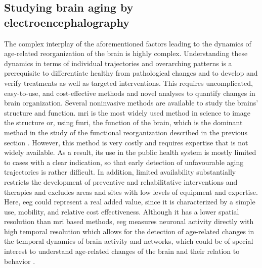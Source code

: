 \subsection{Studying brain aging by electroencephalography}
The complex interplay of the aforementioned factors leading to the dynamics of age-related reorganization of the brain is highly complex. Understanding these dynamics in terms of individual trajectories and overarching patterns is a prerequisite to differentiate healthy from pathological changes and to develop and verify treatments as well as targeted interventions. This requires uncomplicated, easy-to-use, and cost-effective methods and novel analyses to quantify changes in brain organization. Several noninvasive methods are available to study the brains' structure and function. \Gls{mri} is the most widely used method in science to image the structure or, using \gls{fmri}, the function of the brain, which is the dominant method in the study of the functional reorganization described in the previous section \cite{Reuter-Lorenz2010}. However, this method is very costly and requires expertise that is not widely available. As a result, its use in the public health system is mostly limited to cases with a clear indication, so that early detection of unfavourable aging trajectories is rather difficult. In addition, limited availability substantially restricts the development of preventive and rehabilitative interventions and therapies and excludes areas and sites with low levels of equipment and expertise. Here, \gls{eeg} could represent a real added value, since it is characterized by a simple use, mobility, and relative cost effectiveness. Although it has a lower spatial resolution than \gls{mri} based methods, \gls{eeg} measures neuronal activity directly with high temporal resolution which allows for the detection of age-related changes in the temporal dynamics of brain activity and networks, which could be of special interest to understand age-related changes of the brain and their relation to behavior \cite{Courtney2021}.

